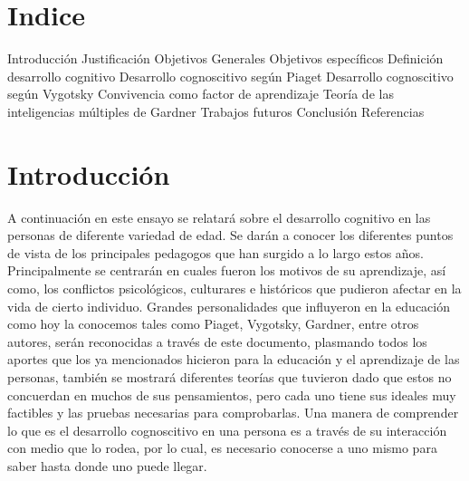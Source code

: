 \documentclass{bmcart}
\begin{document}
\section*{Indice}
Introducción 
\newline 
\newline 
Justificación
\newline 
\newline 
Objetivos Generales
\newline 
\newline 
Objetivos específicos
\newline 
\newline 
Definición desarrollo cognitivo
\newline 
\newline 
Desarrollo cognoscitivo según Piaget
\newline 
\newline 
Desarrollo cognoscitivo según Vygotsky
\newline 
\newline 
Convivencia como factor de aprendizaje
\newline 
\newline 
Teoría de las inteligencias múltiples de Gardner
\newline 
\newline 
Trabajos futuros
\newline 
\newline 
Conclusión
\newline 
\newline 
Referencias
\newpage
\section{Introducción}
A continuación en este ensayo se relatará sobre el desarrollo cognitivo en las personas de diferente variedad de edad. Se darán a conocer los diferentes puntos de vista de los principales pedagogos que han surgido a lo largo estos años.
\newline 
Principalmente se centrarán en cuales fueron los motivos de su aprendizaje, así como, los conflictos psicológicos, culturares e históricos que pudieron afectar en la vida de cierto individuo.
\newline 
Grandes personalidades que influyeron en la educación como hoy la conocemos tales como Piaget, Vygotsky, Gardner, entre otros autores, serán reconocidas a través de este documento, plasmando todos los aportes que los ya mencionados hicieron para la educación y el aprendizaje de las personas, también se mostrará diferentes teorías que tuvieron dado que estos no concuerdan en muchos de sus pensamientos, pero cada uno tiene sus ideales muy factibles y las pruebas necesarias para comprobarlas.
\newline 
Una manera de comprender lo que es el desarrollo cognoscitivo en una persona es a través de su interacción con medio que lo rodea, por lo cual, es necesario conocerse a uno mismo para saber hasta donde uno puede llegar.
\end{document}

